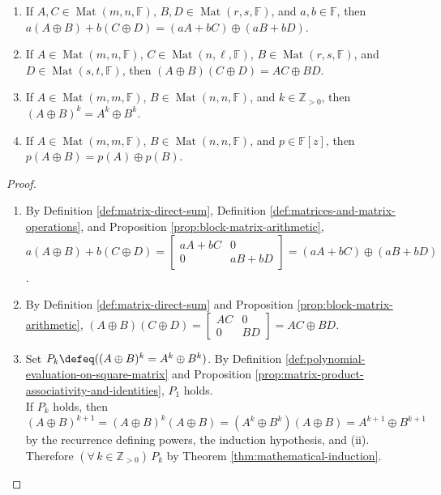\begin{proposition} \label{prop:direct-sum-matrix-algebra} 
\begin{enumerate}[label=(\roman*)]
\setlength{\itemsep}{0pt}
\item If $A,C\in\operatorname{Mat}(m,n,\mathbb{F})$, $B,D\in\operatorname{Mat}(r,s,\mathbb{F})$, and $a,b\in\mathbb{F}$, then $a(A\oplus B)+b(C\oplus D)=(aA+bC)\oplus(aB+bD)$.
\item If $A\in\operatorname{Mat}(m,n,\mathbb{F})$, $C\in\operatorname{Mat}(n,\ell,\mathbb{F})$, $B\in\operatorname{Mat}(r,s,\mathbb{F})$, and $D\in\operatorname{Mat}(s,t,\mathbb{F})$, then $(A\oplus B)(C\oplus D)=AC\oplus BD$.
\item If $A\in\operatorname{Mat}(m,m,\mathbb{F})$, $B\in\operatorname{Mat}(n,n,\mathbb{F})$, and $k\in\mathbb{Z}_{>0}$, then $(A\oplus B)^k=A^k\oplus B^k$.
\item If $A\in\operatorname{Mat}(m,m,\mathbb{F})$, $B\in\operatorname{Mat}(n,n,\mathbb{F})$, and $p\in\mathbb{F}[z]$, then $p(A\oplus B)=p(A)\oplus p(B)$.
\end{enumerate}
\begin{proof}
\begin{enumerate}[label=(\roman*)]
\setlength{\itemsep}{0pt}
\item By Definition \ref{def:matrix-direct-sum}, Definition \ref{def:matrices-and-matrix-operations}, and Proposition \ref{prop:block-matrix-arithmetic}, $a(A\oplus B)+b(C\oplus D)=\left[\begin{smallmatrix}aA+bC&0\\0&aB+bD\end{smallmatrix}\right]=(aA+bC)\oplus(aB+bD)$.
\item By Definition \ref{def:matrix-direct-sum} and Proposition \ref{prop:block-matrix-arithmetic}, $(A\oplus B)(C\oplus D)=\left[\begin{smallmatrix}AC&0\\0&BD\end{smallmatrix}\right]=AC\oplus BD$.
\item Set $P_k\defeq((A\oplus B)^k=A^k\oplus B^k)$. By Definition \ref{def:polynomial-evaluation-on-square-matrix} and Proposition \ref{prop:matrix-product-associativity-and-identities}, $P_1$ holds.\\
If $P_k$ holds, then $(A\oplus B)^{k+1}=(A\oplus B)^k(A\oplus B)=(A^k\oplus B^k)(A\oplus B)=A^{k+1}\oplus B^{k+1}$ by the recurrence defining powers, the induction hypothesis, and (ii). Therefore $(\forall\,k\in\mathbb{Z}_{>0})\,P_k$ by Theorem \ref{thm:mathematical-induction}.

\end{enumerate}
\end{proof}
\end{proposition}
